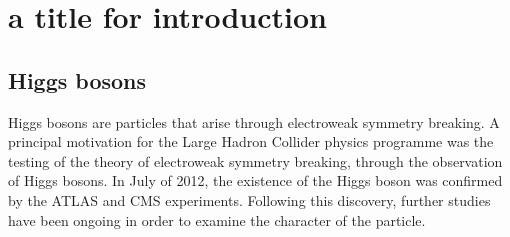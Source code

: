 \chapter{a title for introduction}
\label{chapter:introduction}

\section{Higgs bosons}

Higgs bosons are particles that arise through electroweak symmetry breaking. A principal motivation for the Large Hadron Collider physics programme was the testing of the theory of electroweak symmetry breaking, through the observation of Higgs bosons. In July of 2012, the existence of the Higgs boson was confirmed by the ATLAS and CMS experiments. Following this discovery, further studies have been ongoing in order to examine the character of the particle.